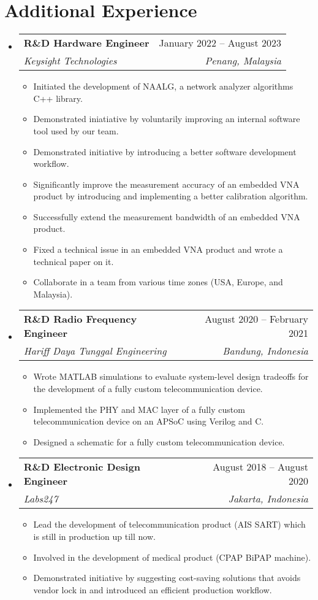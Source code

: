 \documentclass[letterpaper,11pt]{article}
\makeatletter
\newcommand{\resumeItem}[1]{
  \item\small{
    {#1 \vspace{-2pt}}
  }
}
\newcommand{\resumeSubheading}[4]{
  \vspace{-2pt}\item
    \begin{tabular*}{0.97\textwidth}[t]{l@{\extracolsep{\fill}}r}
      \textbf{#1} & #2 \\
      \textit{\small#3} & \textit{\small #4} \\
    \end{tabular*}\vspace{-7pt}
}
\newcommand{\resumeSubHeadingListStart}{\begin{itemize}[leftmargin=0.15in, label={}]}
\newcommand{\resumeSubHeadingListEnd}{\end{itemize}}
\newcommand{\resumeItemListStart}{\begin{itemize}}
\newcommand{\resumeItemListEnd}{\end{itemize}\vspace{-5pt}}
\makeatother
\begin{document}
\section{Additional Experience}
\resumeSubHeadingListStart
\resumeSubheading
  {R\&D Hardware Engineer}{January 2022 -- August 2023}
  {Keysight Technologies}{Penang, Malaysia}
\resumeItemListStart
\resumeItem{Initiated the development of NAALG, a network analyzer algorithms
C++ library.}
\resumeItem{Demonstrated iniatiative by voluntarily improving an internal
software tool used by our team.}
\resumeItem{Demonstrated initiative by introducing a better software
development workflow.}
\resumeItem{Significantly improve the measurement accuracy of an embedded VNA
product by introducing and implementing a better calibration algorithm.}
\resumeItem{Successfully extend the measurement bandwidth of an embedded VNA
product.}
\resumeItem{Fixed a technical issue in an embedded VNA product and wrote a
technical paper on it.}
\resumeItem{Collaborate in a team from various time zones (USA, Europe, and
Malaysia).}
\resumeItemListEnd

\resumeSubheading
  {R\&D Radio Frequency Engineer}{August 2020 -- February 2021}
  {Hariff Daya Tunggal Engineering}{Bandung, Indonesia}
\resumeItemListStart
\resumeItem{Wrote MATLAB simulations to evaluate system-level design tradeoffs
for the development of a fully custom telecommunication device.}
\resumeItem{Implemented the PHY and MAC layer of a fully custom telecommunication
device on an APSoC using Verilog and C.}
\resumeItem{Designed a schematic for a fully custom telecommunication device.}
\resumeItemListEnd

\resumeSubheading
  {R\&D Electronic Design Engineer}{August 2018 -- August 2020}
  {Labs247}{Jakarta, Indonesia}
\resumeItemListStart
\resumeItem{Lead the development of telecommunication product (AIS SART) which
is still in production up till now.}
\resumeItem{Involved in the development of medical product (CPAP BiPAP
machine).}
\resumeItem{Demonstrated initiative by suggesting cost-saving solutions that
avoids vendor lock in and introduced an efficient production workflow.}
\resumeItemListEnd
\resumeSubHeadingListEnd

\end{document}
